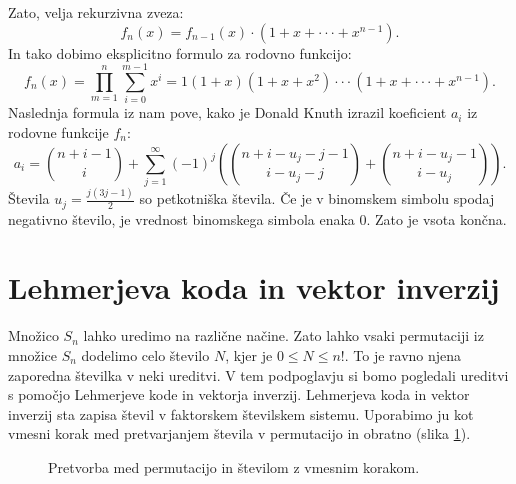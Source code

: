 \documentclass[a4paper, 12pt]{book}
\begin{document}
Zato, velja rekurzivna zveza:
\[
    f_n(x) = f_{n-1}(x) \cdot (1 + x + \cdot\cdot\cdot + x^{n-1}).
\]
In tako dobimo eksplicitno formulo za rodovno funkcijo:
\[
    f_n(x) = \prod_{m=1}^{n}\sum_{i=0}^{m-1} x^i = 1 (1 + x) (1 + x + x^2) \cdot\cdot\cdot (1 + x + \cdot\cdot\cdot + x^{n-1}).
\]
Naslednja formula iz \cite{generatingFunction} nam pove, kako je Donald Knuth izrazil koeficient $a_i$ iz rodovne funkcije $f_n$:
\[
    a_i = \binom{n+i-1}{i} + \sum_{j=1}^{\infty} (-1)^j (\binom{n+i-u_j-j-1}{i-u_j-j} + \binom{n+i-u_j-1}{i-u_j}).
\]
Števila $u_j = \frac{j(3j-1)}{2}$ so petkotniška števila. Če je v binomskem simbolu spodaj negativno število, je vrednost binomskega simbola enaka $0$. Zato je vsota končna.

\section{ Lehmerjeva koda in vektor inverzij}
Množico $S_n$ lahko uredimo na različne načine. Zato lahko vsaki permutaciji iz množice $S_n$ dodelimo celo število $N$, kjer je $0 \leq N \leq n!$. To je ravno njena zaporedna številka v neki ureditvi. V tem podpoglavju si bomo pogledali ureditvi s pomočjo Lehmerjeve kode in vektorja inverzij. Lehmerjeva koda in vektor inverzij sta zapisa števil v faktorskem številskem sistemu. Uporabimo ju kot vmesni korak med pretvarjanjem števila v permutacijo in obratno (slika \ref{pretvarjanje_permutacija_stevilo}).
\begin{figure}[h]
    \begin{center}        
    \end{center}
    \caption{Pretvorba med permutacijo in številom z vmesnim korakom.}
    \label{pretvarjanje_permutacija_stevilo}
\end{figure}
\end{document}
